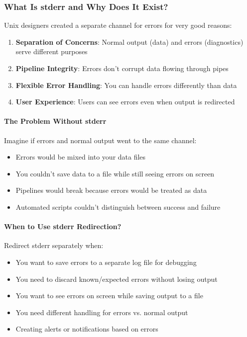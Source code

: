 \subsubsection{What Is stderr and Why Does It Exist?}

Unix designers created a separate channel for errors for very good reasons:

\begin{enumerate}
	\item \textbf{Separation of Concerns}: Normal output (data) and errors (diagnostics) serve different purposes
	\item \textbf{Pipeline Integrity}: Errors don't corrupt data flowing through pipes
	\item \textbf{Flexible Error Handling}: You can handle errors differently than data
	\item \textbf{User Experience}: Users can see errors even when output is redirected
\end{enumerate}

\paragraph{The Problem Without stderr}

Imagine if errors and normal output went to the same channel:
\begin{itemize}
	\item Errors would be mixed into your data files
	\item You couldn't save data to a file while still seeing errors on screen
	\item Pipelines would break because errors would be treated as data
	\item Automated scripts couldn't distinguish between success and failure
\end{itemize}

\paragraph{When to Use stderr Redirection?}

Redirect stderr separately when:
\begin{itemize}
	\item You want to save errors to a separate log file for debugging
	\item You need to discard known/expected errors without losing output
	\item You want to see errors on screen while saving output to a file
	\item You need different handling for errors vs. normal output
	\item Creating alerts or notifications based on errors
\end{itemize}

